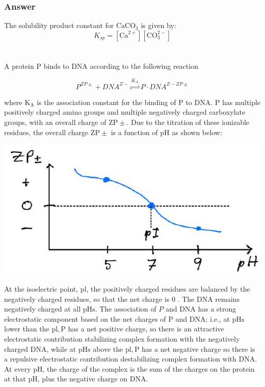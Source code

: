 \documentclass[12pt]{article}
\begin{document}
\subsubsection{Answer}
The solubility product constant for $\mathrm{CaCO}_{3}$ is given by:
\begin{equation}
K_{sp}=[\mathrm{Ca}^{2+}][\mathrm{CO}_{3}^{2-}]
\end{equation}


\section{}
A protein $\mathrm{P}$ binds to DNA according to the following reaction

$$
P^{Z P \pm}+D N A^{Z-} \stackrel{K_{A}}{\rightleftharpoons} P \cdot D N A^{Z-Z P \pm}
$$

where $\mathrm{K}_{\mathrm{A}}$ is the association constant for the binding of $\mathrm{P}$ to DNA. $\mathrm{P}$ has multiple positively charged amino groups and multiple negatively charged carboxylate groups, with an overall charge of $\mathrm{ZP} \pm$. Due to the titration of these ionizable residues, the overall charge $\mathrm{ZP} \pm$ is a function of $\mathrm{pH}$ as shown below:

\begin{center}
\includegraphics[max width=\textwidth]{2024_05_17_4f752ecd7e7a86925d15g-1}
\end{center}

At the isoelectric point, $\mathrm{pl}$, the positively charged residues are balanced by the negatively charged residues, so that the net charge is 0 . The DNA remains negatively charged at all $\mathrm{pHs}$. The association of $P$ and DNA has a strong electrostatic component based on the net charges of $\mathrm{P}$ and $\mathrm{DNA}$; i.e., at $\mathrm{pHs}$ lower than the $\mathrm{pl}, \mathrm{P}$ has a net positive charge, so there is an attractive electrostatic contribution stabilizing complex formation with the negatively charged DNA, while at $\mathrm{pHs}$ above the $\mathrm{pl}, \mathrm{P}$ has a net negative charge so there is a repulsive electrostatic contribution destabilizing complex formation with DNA. At every $\mathrm{pH}$, the charge of the complex is the sum of the charges on the protein at that $\mathrm{pH}$, plus the negative charge on DNA.
\end{document}
